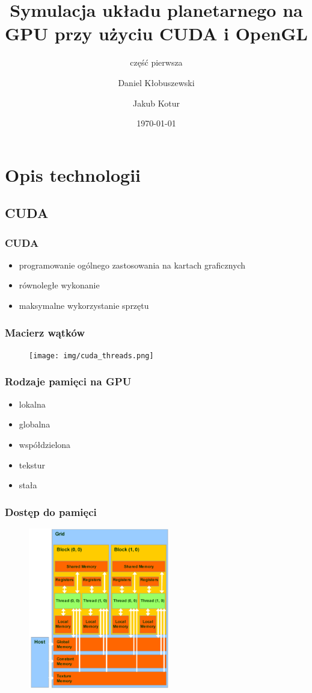\documentclass{beamer}
\title{Symulacja układu planetarnego na GPU przy użyciu CUDA i OpenGL}
\subtitle{część pierwsza}
\author{Daniel Kłobuszewski\and Jakub Kotur}
\institute{Politechnika Warszawska}
\date{\today}
\begin{document}
\frame[plain]{\titlepage}


\section{Opis technologii}\label{sec:opis technologii}


\subsection{CUDA}\label{sub:cuda}

\frame
{
	\frametitle{CUDA}
	\begin{itemize}
	\item{programowanie ogólnego zastosowania na kartach graficznych}
	\item{równoległe wykonanie}
	\item{maksymalne wykorzystanie sprzętu}
	\end{itemize}
}

\frame
{
	\frametitle{Macierz wątków}
	\begin{figure}
		\centering
		\texttt{[image: img/cuda\_threads.png]}
	\end{figure}
}

\frame
{
	\frametitle{Rodzaje pamięci na GPU}

	\begin{itemize}
	\item lokalna
	\item globalna
	\item współdzielona
	\item tekstur
	\item stała
	\end{itemize}
}

\frame
{
	\frametitle{Dostęp do pamięci}
	\begin{figure}
		\centering
		\includegraphics[height=7cm]{img/cuda_memory.png}
	\end{figure}
}
\end{document}
